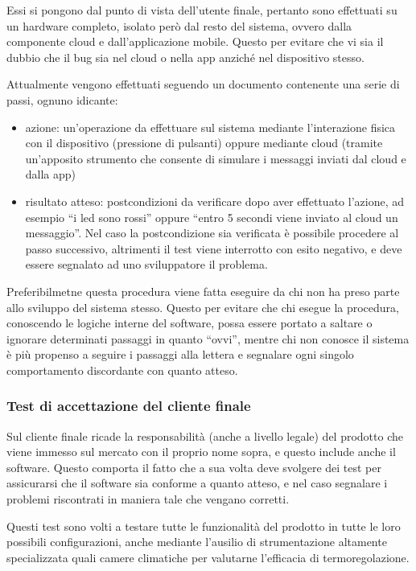 \documentclass[a4paper,titlepage]{article}
\begin{document}
Essi si pongono dal punto di vista dell'utente finale, pertanto sono effettuati su un
hardware completo, isolato però dal resto del sistema, ovvero dalla componente cloud
e dall'applicazione mobile. Questo per evitare che vi sia il dubbio che il bug sia
nel cloud o nella app anziché nel dispositivo stesso.

Attualmente vengono effettuati seguendo un documento contenente una serie di passi, ognuno
idicante:

\begin{itemize}
    \item azione: un'operazione da effettuare sul sistema mediante l'interazione fisica
        con il dispositivo (pressione di pulsanti) oppure mediante cloud (tramite un'apposito
        strumento che consente di simulare i messaggi inviati dal cloud e dalla app)
    \item risultato atteso: postcondizioni da verificare dopo aver effettuato l'azione, ad
        esempio ``i led sono rossi'' oppure ``entro 5 secondi viene inviato al cloud un messaggio''.
        Nel caso la postcondizione sia verificata è possibile procedere al passo successivo, altrimenti
        il test viene interrotto con esito negativo, e deve essere segnalato ad uno sviluppatore il problema.
\end{itemize}

Preferibilmetne questa procedura viene fatta eseguire da chi non ha preso parte allo
sviluppo del sistema stesso. Questo per evitare che chi esegue la procedura, conoscendo
le logiche interne del software, possa essere portato a saltare o ignorare determinati
passaggi in quanto ``ovvi'', mentre chi non conosce il sistema è più propenso a seguire
i passaggi alla lettera e segnalare ogni singolo comportamento discordante con quanto
atteso.

\subsubsection{Test di accettazione del cliente finale}

Sul cliente finale ricade la responsabilità (anche a livello legale) del prodotto
che viene immesso sul mercato con il proprio nome sopra, e questo include anche
il software. Questo comporta il fatto che a sua volta deve svolgere dei test per
assicurarsi che il software sia conforme a quanto atteso, e nel caso segnalare i
problemi riscontrati in maniera tale che vengano corretti.

Questi test sono volti a testare tutte le funzionalità del prodotto in tutte le loro
possibili configurazioni, anche mediante l'ausilio di strumentazione altamente
specializzata quali camere climatiche per valutarne l'efficacia di termoregolazione.
\end{document}
